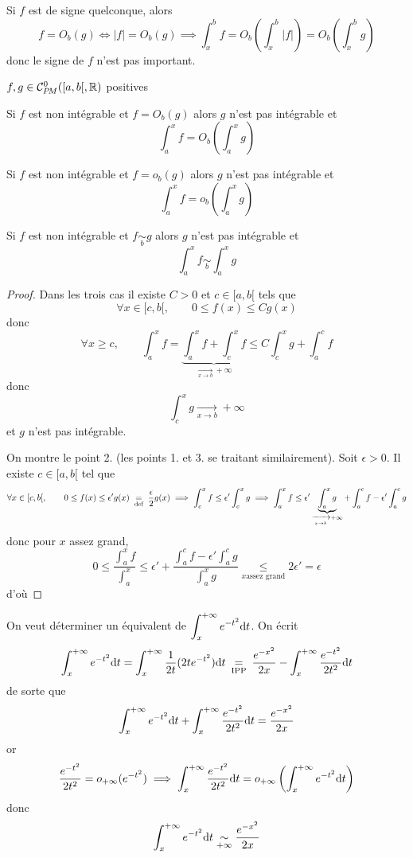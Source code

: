 \begin{rem}
    Si $f$ est de signe quelconque, alors \[
        f=O_b(g)\iff |f|=O_b(g) \implies \int_x^bf=O_b \left(\int_x^b|f|\right)=O_b \left( \int_x^bg \right)
    \]
    donc le signe de $f$ n'est pas important.
\end{rem}

\needspace{10cm}
\begin{thm}
    \Hyp $f, g\in\CPM([a, b[, \R)$ positives
    \begin{concenum}
    \item Si $f$ est non intégrable et $f=O_b(g)$ alors $g$ n'est pas intégrable et \[
            \int_a^xf=O_b \left( \int_a^xg \right)
        \]
    \item Si $f$ est non intégrable et $f=o_b(g)$ alors $g$ n'est pas intégrable et \[
            \int_a^xf=o_b \left( \int_a^xg \right)
        \]
    \item Si $f$ est non intégrable et $f\underset b\sim g$ alors $g$ n'est pas intégrable et \[
            \int_a^xf\underset b\sim \int_a^xg
        \]
    \end{concenum}
\end{thm}

\begin{proof}
    Dans les trois cas il existe $C>0$ et $c\in [a, b[$ tels que \[
        \forall x\in [c, b[, \qquad 0\leq f(x)\leq C g(x)
    \]
    donc \[
        \forall x\geq c, \qquad \int_a^xf=\underbrace{\int_a^xf+\int_c^xf}_{\xrightarrow[x\to b]{}+\infty}\leq C\int_c^xg+\int_a^cf
    \]
    donc \[
        \int_c^xg\xrightarrow[x\to b]{}+\infty
    \]
    et $g$ n'est pas intégrable.

    On montre le point 2. (les points 1. et 3. se traitant similairement). Soit $\epsilon>0$. Il existe $c\in [a, b[$ tel que \[
        \forall x\in [c, b[, \qquad 0\leq f(x)\leq \epsilon'g(x)\;\underset{\text{def}}=\; \frac\epsilon2g(x) \implies \int_c^xf\leq \epsilon'\int_c^xg\implies \int_a^xf\leq \epsilon'\underbrace{\int_a^xg}_{\xrightarrow[x\to b]{}+\infty}+\int_a^cf-\epsilon'\int_a^cg
    \]
    donc pour $x$ assez grand, \[
        0\leq \frac{\displaystyle\int_a^xf}{\displaystyle\int_a^x}\leq \epsilon'+\frac{\displaystyle\int_a^cf-\epsilon'\int_a^cg}{\displaystyle\int_a^xg}\underset{x \text{assez grand}}\leq 2\epsilon'=\epsilon
    \]
    d'où \conc
\end{proof}

\begin{ex}
    On veut déterminer un équivalent de $\displaystyle\int_x^{+\infty}e^{-t^2}\mathrm{d} t$. On écrit \[
        \int_x^{+\infty}e^{-t^2}\mathrm{d} t=\int_x^{+\infty}\frac1{2t}(2te^{-t^2})\mathrm{d} t\underset{\text{\;IPP\;}}=\frac{e^{-x^2}}{2x}-\int_x^{+\infty}\frac{e^{-t^2}}{2t^2}\mathrm{d} t
    \]
    de sorte que \[
        \int_x^{+\infty}e^{-t^2}\mathrm{d} t+\int_x^{+\infty}\frac{e^{-t^2}}{2t^2}\mathrm{d} t=\frac{e^{-x^2}}{2x}
    \]
    or \[
        \frac{e^{-t^2}}{2t^2}=o_{+\infty}(e^{-t^2}) \implies \int_x^{+\infty} \frac{e^{-t^2}}{2t^2}\mathrm{d} t=o_{+\infty} \left( \int_x^{+\infty} e^{-t^2}\mathrm{d} t \right)
    \]
    donc \[
        \int_x^{+\infty}e^{-t^2}\mathrm{d} t\underset{+\infty}\sim\frac{e^{-x^2}}{2x}
    \]
\end{ex}

